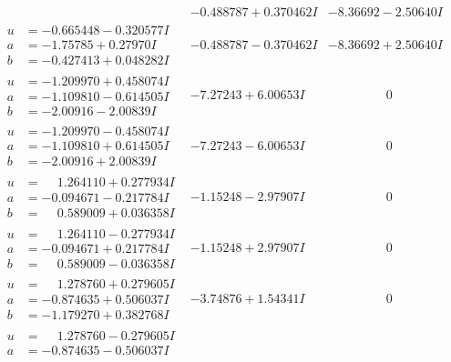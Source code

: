 \documentclass[1p]{elsarticle_modified}
\theoremstyle{definition}
\begin{document}
$$\begin{array}{c|c|c}
 & -0.488787 + 0.370462 I & -8.36692 - 2.50640 I \\ \hline\begin{aligned}
u &= -0.665448 - 0.320577 I \\
a &= -1.75785 + 0.27970 I \\
b &= -0.427413 + 0.048282 I\end{aligned}
 & -0.488787 - 0.370462 I & -8.36692 + 2.50640 I \\ \hline\begin{aligned}
u &= -1.209970 + 0.458074 I \\
a &= -1.109810 - 0.614505 I \\
b &= -2.00916 - 2.00839 I\end{aligned}
 & -7.27243 + 6.00653 I & \phantom{-0.000000 } 0 \\ \hline\begin{aligned}
u &= -1.209970 - 0.458074 I \\
a &= -1.109810 + 0.614505 I \\
b &= -2.00916 + 2.00839 I\end{aligned}
 & -7.27243 - 6.00653 I & \phantom{-0.000000 } 0 \\ \hline\begin{aligned}
u &= \phantom{-}1.264110 + 0.277934 I \\
a &= -0.094671 - 0.217784 I \\
b &= \phantom{-}0.589009 + 0.036358 I\end{aligned}
 & -1.15248 - 2.97907 I & \phantom{-0.000000 } 0 \\ \hline\begin{aligned}
u &= \phantom{-}1.264110 - 0.277934 I \\
a &= -0.094671 + 0.217784 I \\
b &= \phantom{-}0.589009 - 0.036358 I\end{aligned}
 & -1.15248 + 2.97907 I & \phantom{-0.000000 } 0 \\ \hline\begin{aligned}
u &= \phantom{-}1.278760 + 0.279605 I \\
a &= -0.874635 + 0.506037 I \\
b &= -1.179270 + 0.382768 I\end{aligned}
 & -3.74876 + 1.54341 I & \phantom{-0.000000 } 0 \\ \hline\begin{aligned}
u &= \phantom{-}1.278760 - 0.279605 I \\
a &= -0.874635 - 0.506037 I \\

\end{aligned}
\end{array}$$
\end{document}
